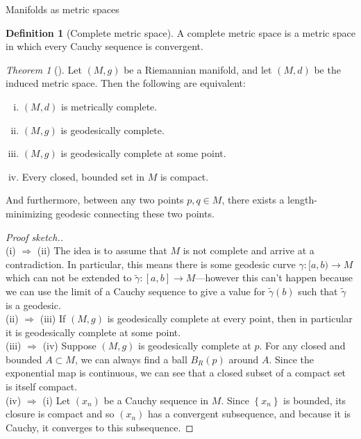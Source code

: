 \documentclass{article}
\newcommand{\fn}[3]{#1 \colon #2 \rightarrow #3}
\newcommand{\set}[1]{\left\{#1\right\}}
\theoremstyle{definition}
\newtheorem{definition}{Definition}[section]
\theoremstyle{remark}
\newtheorem{theorem}{Theorem}[section]
\begin{document}
\begin{section}{Manifolds as metric spaces}
  \begin{definition}[Complete metric space]
    A complete metric space is a metric space in which every Cauchy sequence is
    convergent.
  \end{definition}
  \begin{theorem}[\cite{Hopf}]
    Let $(M, g)$ be a Riemannian manifold, and let $(M, d)$ be the induced
    metric space. Then the following are equivalent:
    \begin{enumerate}[(i)]
      \item $(M, d)$ is metrically complete.
      \item $(M, g)$ is geodesically complete.
      \item $(M, g)$ is geodesically complete at some point.
      \item Every closed, bounded set in $M$ is compact. %
    \end{enumerate}
    And furthermore, between any two points $p, q \in M$, there exists a length-minimizing geodesic connecting these two points.
  \end{theorem}
  \begin{proof}[Proof sketch.] ~\\
    (i) $\Longrightarrow$ (ii) The idea is to assume that $M$ is not complete
    and arrive at a contradiction. In particular, this means there is some
    geodesic curve $\fn \gamma {[a, b)} M$ which can not be extended to
    $\fn {\widetilde\gamma} {[a, b]} M$---however this can't happen because
    we can use the limit of a Cauchy sequence to give a value for
    $\widetilde\gamma(b)$ such that $\widetilde\gamma$ is a geodesic.
    \\
    (ii) $\Longrightarrow$ (iii) If $(M, g)$ is geodesically complete at every
    point, then in particular it is geodesically complete at some point.
    \\
    (iii) $\Longrightarrow$ (iv) Suppose $(M, g)$ is geodesically complete at $p$.
    For any closed and bounded $A \subset M$, we can always find a ball $B_R(p)$
    around $A$. Since the exponential map is continuous, we can see that a
    closed subset of a compact set is itself compact.
    \\
    (iv) $\Longrightarrow$ (i) Let $(x_n)$ be a Cauchy sequence in $M$. Since
    $\set{x_n}$ is bounded, its closure is compact and so $(x_n)$ has a
    convergent subsequence, and because it is Cauchy, it converges to this subsequence.
  \end{proof}
\end{section}
\end{document}
